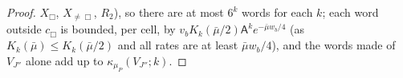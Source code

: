 \begin{proof}
$X_\Box$, $X_{\ne\Box}$, $R_2$), so there are at most $6^k$ words for each $k$; each word outside $c_\Box$ is bounded, per cell, by $v_bK_k(\bar\mu/2)\mathsf A^ke^{-\bar\mu w_b/4}$ (as $K_k(\bar\mu)\le K_k(\bar\mu/2)$ and all rates are at least $\bar\mu w_b/4$), and the words made of $V_{J''}$ alone add up to $\kappa_{\mu_P}(V_{J''};k)$.
\end{proof}
